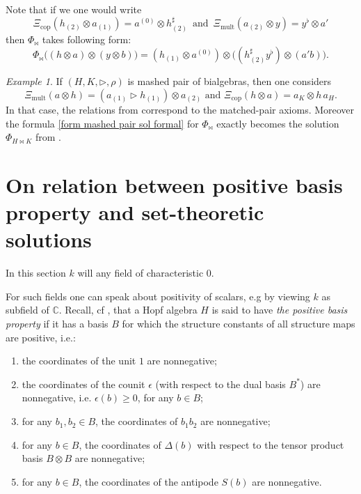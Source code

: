 \documentclass[a4paper,10pt]{amsart}
\theoremstyle{definition}
\theoremstyle{remark}
\newtheorem{example}[lemma]{Example}
\newcommand\D{\Delta}
\newcommand\triangler{\triangleright}
\newcommand{\C}{{\mathbb C}}
\begin{document}
Note that if we one would write 
$$
\Xi_{\mathrm{cop}}(h_{(2)}\otimes a_{(1)})=a^{(0)}\otimes h_{(2)}^{\sharp} \,
\text{ and }\,
\Xi_{\mathrm{mult}}(a_{(2)}\otimes y)=y^{\flat}\otimes a'
$$
then $\Phi_{\bowtie}$ takes following form:
\begin{equation}\label{form mashed pair sol formal}
\Phi_{\bowtie}\bigl((h\otimes a)\otimes (y\otimes b)\bigr)
=
(h_{(1)}\otimes a^{(0)})
\otimes
\bigl(
(h_{(2)}^{\sharp}y^{\flat})\otimes (a'b)
\bigr).
\end{equation}

\begin{example}
If $(H,K, \triangler, \rho)$ is mashed pair of bialgebras, then one considers
\[
\Xi_{\mathrm{mult}}(a\otimes h)=(a_{(1)}\triangleright h_{(1)})\otimes a_{(2)}
\text{ and }
\Xi_{\mathrm{cop}}(h\otimes a)=a_K\otimes h\,a_H.
\]
In that case, the relations from  correspond to the matched-pair axioms. Moreover the formula \eqref{form mashed pair sol formal} for $\Phi_{\bowtie}$ exactly becomes the solution $\Phi_{H \bowtie K}$ from .
\end{example}

\section{On relation between positive basis property and set-theoretic solutions}\label{section positive basis}

 In this section $k$ will any field of characteristic $0$.\smallskip

For such fields one can speak about positivity of scalars, e.g by viewing $k$ as subfield of $\C$.  Recall, cf \cite{zbMATH01616308}, that a Hopf algebra $H$ is said to have {\it the positive basis property} if it has a basis $B$ for which the structure constants of all structure maps are positive, i.e.:
\begin{enumerate}
    \item the coordinates of the unit $1$ are nonnegative;
    \item the coordinates of the counit $\epsilon$ (with respect to the dual basis $B^{\ast}$) are nonnegative, i.e. $\epsilon(b)\geq 0$, for any $b\in B$;
    \item for any $b_1, b_2\in B$, the coordinates of $b_1 b_2$ are nonnegative;
    \item for any $b\in B$, the coordinates of $\D(b)$ with respect to the tensor product basis $B \otimes B$  are nonnegative;
    \item for any $b\in B$, the coordinates of the antipode $S(b)$ are nonnegative.
\end{enumerate}
\end{document}
